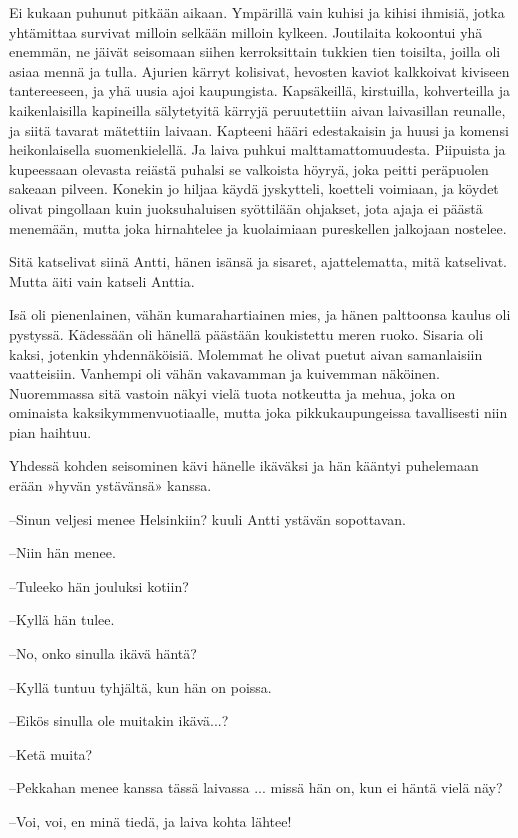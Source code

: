 \documentclass[a4paper,finnish,12pt]{scrartcl}
\begin{document}
Ei kukaan puhunut pitkään aikaan. Ympärillä vain kuhisi ja kihisi
ihmisiä, jotka yhtämittaa survivat milloin selkään milloin kylkeen.
Joutilaita kokoontui yhä enemmän, ne jäivät seisomaan siihen
kerroksittain tukkien tien toisilta, joilla oli asiaa mennä ja tulla.
Ajurien kärryt kolisivat, hevosten kaviot kalkkoivat kiviseen
tantereeseen, ja yhä uusia ajoi kaupungista. Kapsäkeillä, kirstuilla,
kohverteilla ja kaikenlaisilla kapineilla sälytetyitä kärryjä
peruutettiin aivan laivasillan reunalle, ja siitä tavarat mätettiin
laivaan. Kapteeni hääri edestakaisin ja huusi ja komensi heikonlaisella
suomenkielellä. Ja laiva puhkui malttamattomuudesta. Piipuista ja
kupeessaan olevasta reiästä puhalsi se valkoista höyryä, joka peitti
peräpuolen sakeaan pilveen. Konekin jo hiljaa käydä jyskytteli,
koetteli voimiaan, ja köydet olivat pingollaan kuin juoksuhaluisen
syöttilään ohjakset, jota ajaja ei päästä menemään, mutta joka
hirnahtelee ja kuolaimiaan pureskellen jalkojaan nostelee.

Sitä katselivat siinä Antti, hänen isänsä ja sisaret, ajattelematta,
mitä katselivat. Mutta äiti vain katseli Anttia.

Isä oli pienenlainen, vähän kumarahartiainen mies, ja hänen palttoonsa
kaulus oli pystyssä. Kädessään oli hänellä päästään koukistettu meren
ruoko. Sisaria oli kaksi, jotenkin yhdennäköisiä. Molemmat he olivat
puetut aivan samanlaisiin vaatteisiin. Vanhempi oli vähän vakavamman ja
kuivemman näköinen. Nuoremmassa sitä vastoin näkyi vielä tuota
notkeutta ja mehua, joka on ominaista kaksikymmenvuotiaalle, mutta joka
pikkukaupungeissa tavallisesti niin pian haihtuu.

Yhdessä kohden seisominen kävi hänelle ikäväksi ja hän kääntyi
puhelemaan erään »hyvän ystävänsä» kanssa.

--Sinun veljesi menee Helsinkiin? kuuli Antti ystävän sopottavan.

--Niin hän menee.

--Tuleeko hän jouluksi kotiin?

--Kyllä hän tulee.

--No, onko sinulla ikävä häntä?

--Kyllä tuntuu tyhjältä, kun hän on poissa.

--Eikös sinulla ole muitakin ikävä...?

--Ketä muita?

--Pekkahan menee kanssa tässä laivassa ... missä hän on, kun ei häntä
vielä näy?

--Voi, voi, en minä tiedä, ja laiva kohta lähtee!
\end{document}
